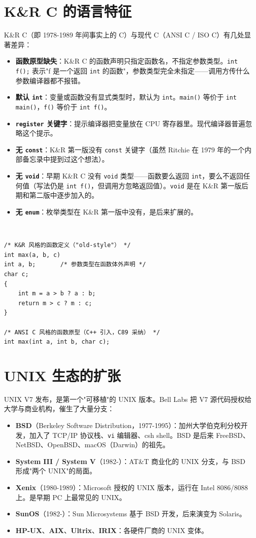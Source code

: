 \documentclass[12pt,a4paper,fontset=fandol]{ctexbook}
\newcommand{\clabel}{%
  \tcbox[on line,colback=cheadbg,colframe=cheadbg,
    boxrule=0pt,arc=1pt,left=2pt,right=2pt,top=1pt,bottom=1pt,
    colupper=white,fontupper=\scriptsize\bfseries]{C}}
\newcommand{\yearlabel}[1]{%
  \tcbox[on line,colback=yearheadbg,colframe=yearheadbg,
    boxrule=0pt,arc=1pt,left=3pt,right=3pt,top=1pt,bottom=1pt,
    colupper=white,fontupper=\scriptsize\bfseries]{#1}}
\newcommand{\kw}[1]{\texttt{#1}}
\newcommand{\yrlbl}[1]{\yearlabel{#1}}
\begin{document}
\section{K\&R C 的语言特征}

K\&R C（即 1978-1989 年间事实上的 C）与现代 C（ANSI C / ISO C）有几处显著差异：

\begin{itemize}
  \item \textbf{函数原型缺失}：K\&R C 的函数声明只指定函数名，不指定参数类型。\kw{int f();} 表示"f 是一个返回 \kw{int} 的函数"，参数类型完全未指定——调用方传什么参数编译器都不报错。
  \item \textbf{默认 \kw{int}}：变量或函数没有显式类型时，默认为 \kw{int}。\kw{main()} 等价于 \kw{int main()}，\kw{f()} 等价于 \kw{int f()}。
  \item \textbf{\kw{register} 关键字}：提示编译器把变量放在 CPU 寄存器里。现代编译器普遍忽略这个提示。
  \item \textbf{无 \kw{const}}：K\&R 第一版没有 \kw{const} 关键字（虽然 Ritchie 在 1979 年的一个内部备忘录中提到过这个想法）。
  \item \textbf{无 \kw{void}}：早期 K\&R C 没有 \kw{void} 类型——函数要么返回 \kw{int}，要么不返回任何值（写法仍是 \kw{int f()}，但调用方忽略返回值）。\kw{void} 是在 K\&R 第一版后期和第二版中逐步加入的。
  \item \textbf{无 \kw{enum}}：枚举类型在 K\&R 第一版中没有，是后来扩展的。
\end{itemize}

\clabel\ \begin{lstlisting}[style=cstyle]
/* K&R 风格的函数定义（"old-style"） */
int max(a, b, c)
int a, b;       /* 参数类型在函数体外声明 */
char c;
{
    int m = a > b ? a : b;
    return m > c ? m : c;
}

/* ANSI C 风格的函数原型（C++ 引入，C89 采纳） */
int max(int a, int b, char c);
\end{lstlisting}

\section{UNIX 生态的扩张}

\yrlbl{1979} UNIX V7 发布，是第一个"可移植"的 UNIX 版本。Bell Labs 把 V7 源代码授权给大学与商业机构，催生了大量分支：

\begin{itemize}
  \item \textbf{BSD}（Berkeley Software Distribution，1977-1995）：加州大学伯克利分校开发，加入了 TCP/IP 协议栈、\kw{vi} 编辑器、csh shell。BSD 是后来 FreeBSD、NetBSD、OpenBSD、macOS（Darwin）的祖先。
  \item \textbf{System III / System V}（1982-）：AT\&T 商业化的 UNIX 分支，与 BSD 形成"两个 UNIX"的局面。
  \item \textbf{Xenix}（1980-1989）：Microsoft 授权的 UNIX 版本，运行在 Intel 8086/8088 上。是早期 PC 上最常见的 UNIX。
  \item \textbf{SunOS}（1982-）：Sun Microsystems 基于 BSD 开发，后来演变为 Solaris。
  \item \textbf{HP-UX}、\textbf{AIX}、\textbf{Ultrix}、\textbf{IRIX}：各硬件厂商的 UNIX 变体。
\end{itemize}
\end{document}
